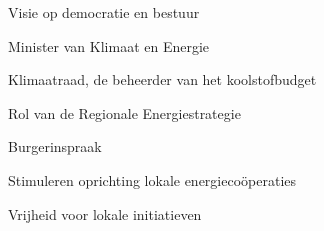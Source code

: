 
\begin{voorstel}{Visie op democratie en bestuur}\end{voorstel}

\begin{voorstel}{Minister van Klimaat en Energie}\end{voorstel}
\begin{voorstel}{Klimaatraad, de beheerder van het koolstofbudget}\end{voorstel}
\begin{voorstel}{Rol van de Regionale Energiestrategie}\end{voorstel}
\begin{voorstel}{Burgerinspraak}\end{voorstel}
\begin{voorstel}{Stimuleren oprichting lokale energiecoöperaties}\end{voorstel}
\begin{voorstel}{Vrijheid voor lokale initiatieven}\end{voorstel}
